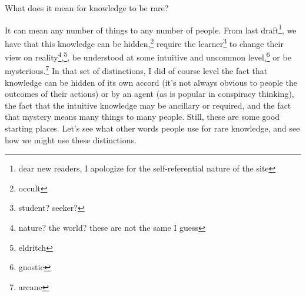 \documentclass[12pt]{article}
\renewcommand{\,}{\textsuperscript{,}}
\begin{document}
What does it mean for knowledge to be rare?

It can mean any number of things to any number of people.  
From last draft\footnote{dear new readers, I apologize for the self-referential nature of the site}, we have that this knowledge can be hidden,\footnote{occult} require the learner\footnote{student? seeker?} to change their view on reality\footnote{nature? the world? these are not the same I guess},\footnote{eldritch}, be understood at some intuitive and uncommon level,\footnote{gnostic} or be mysterious.\footnote{arcane}  
In that set of distinctions, I did of course level the fact that knowledge can be hidden of its own accord (it's not always obvious to people the outcomes of their actions) or by an agent (as is popular in conspiracy thinking), the fact that the intuitive knowledge may be ancillary or required, and the fact that mystery means many things to many people.  
Still, these are some good starting places.  
Let's see what other words people use for rare knowledge, and see how we might use these distinctions.
\end{document}
